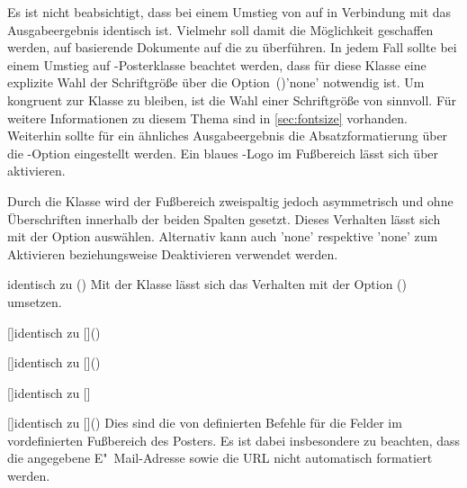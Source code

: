 \begin{Bundle*}{}
Es ist nicht beabsichtigt, dass bei einem Umstieg von  auf 
 in Verbindung mit  das Ausgabeergebnis 
identisch ist. Vielmehr soll damit die Möglichkeit geschaffen werden, auf 
 basierende Dokumente auf die  zu 
überführen. In jedem Fall sollte bei einem Umstieg auf \TUDScript-Posterklasse 
beachtet werden, dass für diese Klasse eine explizite Wahl der Schriftgröße 
über die Option~()'none' notwendig ist. 
Um kongruent zur Klasse  zu bleiben, ist die Wahl einer 
Schriftgröße von  sinnvoll. Für weitere 
Informationen zu diesem Thema sind in \autoref{sec:fontsize} vorhanden. 
Weiterhin sollte für ein ähnliches Ausgabeergebnis die Absatzformatierung über 
die \KOMAScript-Option  eingestellt werden. Ein blaues 
\DDC-Logo im Fußbereich lässt sich über  aktivieren.

\begin{Declaration}{}%
\printdeclarationlist%
%
Durch die Klasse  wird der Fußbereich zweispaltig jedoch 
asymmetrisch und ohne Überschriften innerhalb der beiden Spalten gesetzt. 
Dieses Verhalten lässt sich mit der Option  
auswählen. Alternativ kann auch 'none' respektive 
'none' zum Aktivieren beziehungsweise Deaktivieren 
verwendet werden.
\end{Declaration}

\begin{Declaration}{}{%
  identisch zu ()%
}
\printdeclarationlist%
%
Mit der Klasse  lässt sich das Verhalten mit der Option 
() umsetzen.
\end{Declaration}

\begin{Declaration}{[]}{identisch zu 
  []()%
}
\begin{Declaration}{[]}{identisch zu 
  []()%
}
\begin{Declaration}{[]}{identisch zu 
  []%
}
\begin{Declaration}{[]}{identisch zu 
  []()%
}
\printdeclarationlist%
%
Dies sind die von  definierten Befehle für die Felder im 
vordefinierten Fußbereich des Posters. Es ist dabei insbesondere zu beachten, 
dass die angegebene E"~Mail-Adresse sowie die URL nicht automatisch formatiert 
werden.
\end{Declaration}
\end{Declaration}
\end{Declaration}
\end{Declaration}


\end{Bundle*}
